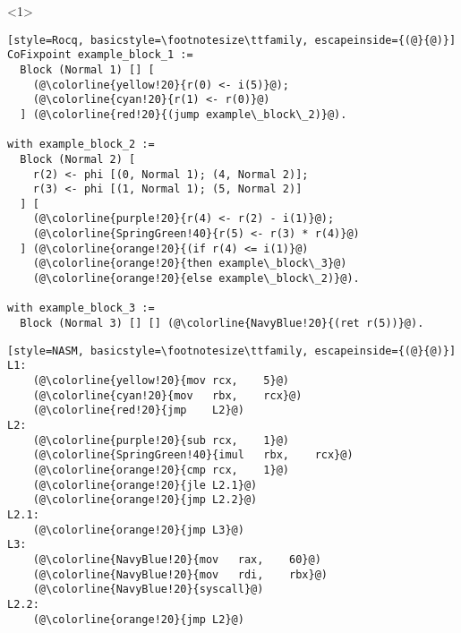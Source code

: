 
\begin{onlyenv}<1>
\begin{minipage}{0.58\linewidth}
\begin{lstlisting}[style=Rocq, basicstyle=\footnotesize\ttfamily, escapeinside={(@}{@)}]
CoFixpoint example_block_1 :=
  Block (Normal 1) [] [
    (@\colorline{yellow!20}{r(0) <- i(5)}@);
    (@\colorline{cyan!20}{r(1) <- r(0)}@)
  ] (@\colorline{red!20}{(jump example\_block\_2)}@).

with example_block_2 :=
  Block (Normal 2) [
    r(2) <- phi [(0, Normal 1); (4, Normal 2)];
    r(3) <- phi [(1, Normal 1); (5, Normal 2)]
  ] [
    (@\colorline{purple!20}{r(4) <- r(2) - i(1)}@);
    (@\colorline{SpringGreen!40}{r(5) <- r(3) * r(4)}@)
  ] (@\colorline{orange!20}{(if r(4) <= i(1)}@)
    (@\colorline{orange!20}{then example\_block\_3}@)
    (@\colorline{orange!20}{else example\_block\_2)}@).

with example_block_3 :=
  Block (Normal 3) [] [] (@\colorline{NavyBlue!20}{(ret r(5))}@).
\end{lstlisting}
\end{minipage}
\hfill
\begin{minipage}{0.38\linewidth}
\begin{lstlisting}[style=NASM, basicstyle=\footnotesize\ttfamily, escapeinside={(@}{@)}]
L1:
	(@\colorline{yellow!20}{mov	rcx,	5}@)
	(@\colorline{cyan!20}{mov	rbx,	rcx}@)
	(@\colorline{red!20}{jmp	L2}@)
L2:
	(@\colorline{purple!20}{sub	rcx,	1}@)
	(@\colorline{SpringGreen!40}{imul	rbx,	rcx}@)
	(@\colorline{orange!20}{cmp	rcx,	1}@)
	(@\colorline{orange!20}{jle	L2.1}@)
	(@\colorline{orange!20}{jmp	L2.2}@)
L2.1:
	(@\colorline{orange!20}{jmp	L3}@)
L3:
	(@\colorline{NavyBlue!20}{mov	rax,	60}@)
	(@\colorline{NavyBlue!20}{mov	rdi,	rbx}@)
	(@\colorline{NavyBlue!20}{syscall}@)
L2.2:
	(@\colorline{orange!20}{jmp	L2}@)
\end{lstlisting}
\end{minipage}
\end{onlyenv}




